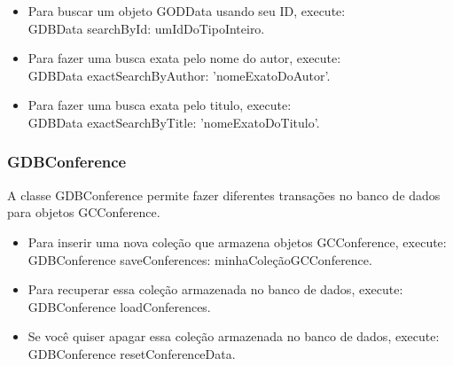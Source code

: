 \documentclass[a4paper, 10pt]{article}
\begin{document}
\begin{newpage}
\begin{itemize}
\item Para buscar um objeto GODData usando seu ID, execute:\\
{ GDBData searchById: umIdDoTipoInteiro.}
\item Para fazer uma busca exata pelo nome do autor, execute:\\
{ GDBData exactSearchByAuthor: 'nomeExatoDoAutor'.}
\item Para fazer uma busca exata pelo titulo, execute:\\
{ GDBData exactSearchByTitle: 'nomeExatoDoTitulo'.}	

\end{itemize}


\subsubsection{GDBConference}
A classe GDBConference permite fazer diferentes transações no banco de dados para objetos GCConference. 

\begin{itemize}
\item Para inserir uma nova coleção que armazena objetos GCConference, execute:\\
{GDBConference saveConferences: minhaColeçãoGCConference.}
\item Para recuperar essa coleção armazenada no banco de dados, execute:\\
{GDBConference loadConferences.}
\item Se você quiser apagar essa coleção armazenada no banco de dados, execute:\\
{GDBConference resetConferenceData.}
\end{itemize}

\end{newpage}
\end{document}
